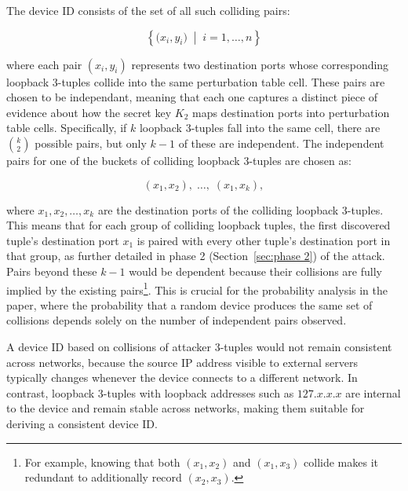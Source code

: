 \documentclass[twocolumn]{report}
\begin{document}
The device ID consists of the set of all such colliding pairs:

\vspace{-0.2cm}
\begin{minipage}{\columnwidth}
	\[
		\left\{ \bigl(x_i, y_i\bigr) \;\middle|\; i = 1, \ldots, n \right\}
	\]
\end{minipage}

where each pair $(x_i, y_i)$ represents \alert{two destination ports} whose corresponding loopback 3-tuples collide into the same perturbation table cell. These pairs are chosen to be \alert{\hypertarget{independant}{independant}}, meaning that each one captures a distinct piece of evidence about how the secret key $K_2$ maps destination ports into perturbation table cells. Specifically, if $k$ loopback 3-tuples fall into the same cell, there are $\binom{k}{2}$ possible pairs, but only $k-1$ of these are independent. The independent pairs for one of the buckets of colliding loopback 3-tuples are chosen as:

\vspace{-0.2cm}
\begin{minipage}{\columnwidth}
	\[
		(x_1, x_2),\; \ldots,\; (x_1, x_k),
	\]
\end{minipage}

where $x_1, x_2, \ldots, x_k$ are the destination ports of the colliding loopback 3-tuples. This means that for each group of colliding loopback tuples, the first discovered tuple's destination port $x_1$ is paired with every other tuple's destination port in that group, as further detailed in phase 2 (Section~\ref{sec:phase 2}) of the attack. Pairs beyond these $k-1$ would be \alert{dependent} because their collisions are fully implied by the existing pairs\footnote{\tiny For example, knowing that both $(x_1, x_2)$ and $(x_1, x_3)$ collide makes it redundant to additionally record $(x_2, x_3)$.}. This is crucial for the probability analysis in the paper, where the probability that a random device produces the same set of collisions depends solely on the number of independent pairs observed.

A device ID based on collisions of \alert{attacker 3-tuples} would not remain consistent across networks, because the source IP address visible to external servers typically changes whenever the device connects to a different network. In contrast, \alert{loopback 3-tuples} with loopback addresses such as $127.x.x.x$ are internal to the device and remain stable across networks, making them suitable for deriving a consistent device ID.
\end{document}
